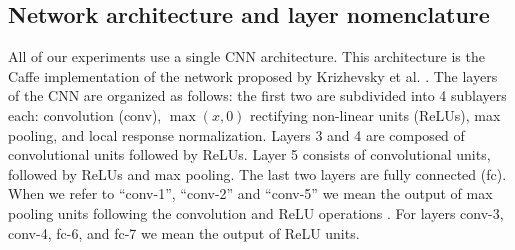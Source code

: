 \subsection{Network architecture and layer nomenclature}
\label{sub:net-arch}
All of our experiments use a single CNN architecture.
This architecture is the Caffe \cite{caffe} implementation of the network proposed by Krizhevsky et al. \cite{Kriz}.
The layers of the CNN are organized as follows: the first two are subdivided into 4 sublayers each: convolution (conv), $\max(x,0)$ rectifying non-linear units (ReLUs), max pooling, and local response normalization. 
Layers 3 and 4 are composed of convolutional units followed by ReLUs.
Layer 5 consists of convolutional units, followed by ReLUs and max pooling.
The last two layers are fully connected (fc). 
When we refer to ``conv-1'', ``conv-2'' and ``conv-5'' we mean the output of max pooling units following the convolution and ReLU operations .
For layers conv-3, conv-4, fc-6, and fc-7 we mean the output of ReLU units.

 

